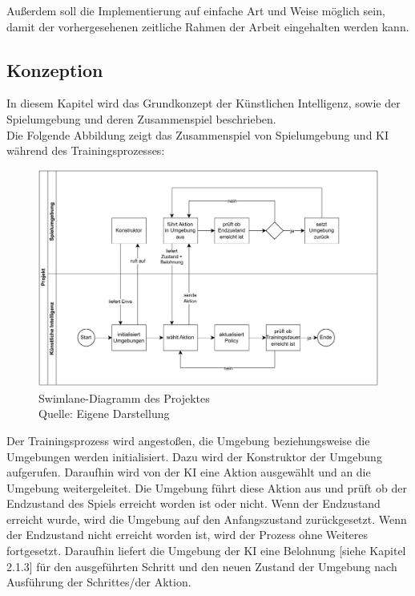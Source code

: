 Außerdem soll die Implementierung auf einfache Art und Weise möglich sein, damit der vorhergesehenen zeitliche Rahmen der Arbeit eingehalten werden kann.
\subsection{Konzeption}
In diesem Kapitel wird das Grundkonzept der Künstlichen Intelligenz, sowie der Spielumgebung und deren Zusammenspiel beschrieben.\\

Die Folgende Abbildung zeigt das Zusammenspiel von Spielumgebung und KI während des Trainingsprozesses:

\nopagebreak
\begin{figure}[H]
	\includegraphics[width=1\textwidth]{Bilder/swimlane.drawio.pdf} 
	\caption[Swimlane-Diagramm des Projektes]{Swimlane-Diagramm des Projektes\\ Quelle: Eigene Darstellung}
\end{figure}	

Der Trainingsprozess wird angestoßen, die Umgebung beziehungsweise die Umgebungen werden initialisiert. Dazu wird der Konstruktor der Umgebung aufgerufen. Daraufhin wird von der KI eine Aktion ausgewählt und an die Umgebung weitergeleitet. Die Umgebung führt diese Aktion aus und prüft ob der Endzustand des Spiels erreicht worden ist oder nicht. Wenn der Endzustand erreicht wurde, wird die Umgebung auf den Anfangszustand zurückgesetzt. Wenn der Endzustand nicht erreicht worden ist, wird der Prozess ohne Weiteres fortgesetzt. Daraufhin liefert die Umgebung der KI eine Belohnung [siehe Kapitel 2.1.3] für den ausgeführten Schritt und den neuen Zustand der Umgebung nach Ausführung der Schrittes/der Aktion.

